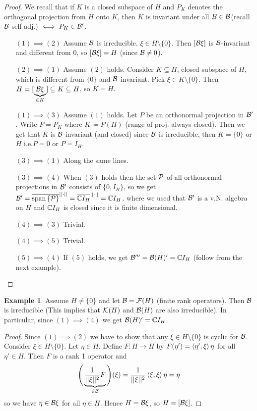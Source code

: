 \documentclass[10pt,english,a4paper]{article}
\theoremstyle{definition}
\newtheorem*{example}{Example}
\begin{document}
\begin{proof}
    We recall that if $K$ is a closed subspace of $H$ and $P_K$ denotes the orthogonal 
projection from $H$ onto $K$, then 
$K$ is invariant under all $B \in \mathcal{B}$(recall $\mathcal{B}$ self adj.) $\iff P_K \in \mathcal{B}'$.

\begin{itemize}
    \item[$(1)\implies (2)$] 
Assume $\mathcal{B}$ is irreducible. $\xi \in H\setminus\{0\}$. 
Then $[\mathcal{B}\xi]$ is $\mathcal{B}$-invariant and different from $0$, so $[\mathcal{B}\xi]=H$
(since $\mathcal{B}\neq 0$).


\item[$(2)\implies (1)$] 
Assume $(2)$ holds. Consider $K\subseteq H$, closed subspace of $H$, which is different 
from $\{0\}$ and $\mathcal{B}$-invariant. Pick $\xi \in K\setminus \{0\}$. 
Then $H = [\underbrace{\mathcal{B}\xi}_{\in K}] \subseteq K \subseteq H$, so $K=H$.

\item[$(1)\implies (3)$]
Assume $(1)$ holds. Let $P$ be an orthonormal projection in $\mathcal{B}'$. Write $P=P_K$
where $K \coloneqq P(H)$ (range of proj. always closed). Then we get that $K$
is $\mathcal{B}$-invariant (and closed) since $\mathcal{B}$ is irreducible, then $K=\{0\}$ or
$H$ i.e.$P=0$ or $P = I_H$.

\item[$(3)\implies (1)$] Along the same lines.
\item[$(3)\implies (4)$] When $(3)$ holds then the set $\mathcal{P}$ of all orthonormal 
projections in $\mathcal{B}'$ consists of $\{0, I_H\}$, so we get 
$\mathcal{B}' = \overline{\text{span} \left\{\mathcal{P}\right\}}^{||\cdot||} = \overline{\mathbb{C} I_H}^{||\cdot||} = \mathbb{C} I_H$.
where we used that $\mathcal{B}'$ is a v.N. algebra on $H$ and $\mathbb{C} I_H$ is closed 
since it is finite dimensional.
 
\item[$(4)\implies (3)$] Trivial. 
\item[$(4)\implies (5)$] Trivial.
\item[$(5)\implies (4)$] If $(5)$ holds, we get $\mathcal{B}''' = \mathcal{B}(H)' = \mathbb{C} I_H$ 
(follow from the next example).
\end{itemize}
\end{proof}


\begin{example}
    Assume $H\neq \{0\}$ and let $\mathcal{B} = \mathcal{F}(H)$ (finite rank operators). 
Then $\mathcal{B}$ is irreducible (This implies that $\mathcal{K}(H)$ and $\mathcal{B}(H)$ are also
irreducible). In particular, since $(1)\implies (4)$ we get $\mathcal{B}(H)' = \mathbb{C} I_H$.

\begin{proof}
    Since $(1)\implies (2)$ we have to show that any $\xi \in H\setminus \{0\}$
is cyclic for $\mathcal{B}$. Consider $\xi \in H\setminus \{0\}$.
Let $\eta \in H$. Define $F \colon H \to H$ by $F(\eta') = \left\langle \eta',\xi \right\rangle\eta$
for all $\eta' \in H$. Then $F$ is a rank 1 operator and 
\[ \Bigg(\underbrace{\frac{1}{||\xi||^2}F}_{\in \mathcal{B}}\Bigg)(\xi) = \frac{1}{||\xi||^2}
\left\langle \xi,\xi \right\rangle\eta = \eta  \]
so we have $\eta \in \mathcal{B}\xi$ for all $\eta \in H$. Hence $H = \mathcal{B}\xi$, so 
$H = [\mathcal{B}\xi]$.
\end{proof}

\end{example}
\end{document}
